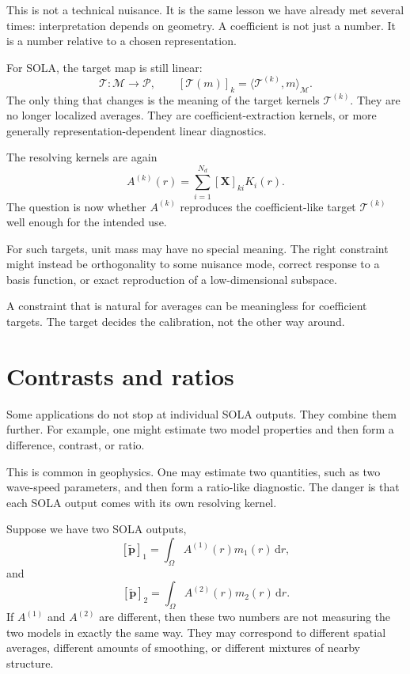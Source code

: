 \documentclass[11pt,openany]{book}
\theoremstyle{definition}
\theoremstyle{remark}
\newcommand{\M}{\mathcal M}
\newcommand{\Pspace}{\mathcal P}
\newcommand{\Tau}{\mathcal{T}}
\newcommand{\dd}{\,\mathrm d}
\begin{document}
This is not a technical nuisance. It is the same lesson we have already met several times:
interpretation depends on geometry. A coefficient is not just a number. It is a number relative
to a chosen representation.

For SOLA, the target map is still linear:
\[
  \Tau:\M\to\Pspace,
  \qquad
  [\Tau(m)]_k
  =
  \langle \mathcal T^{(k)},m\rangle_{\M}.
\]
The only thing that changes is the meaning of the target kernels \(\mathcal T^{(k)}\). They are no
longer localized averages. They are coefficient-extraction kernels, or more generally
representation-dependent linear diagnostics.

The resolving kernels are again
\[
  A^{(k)}(r)
  =
  \sum_{i=1}^{N_d}[\mathbf X]_{ki}K_i(r).
\]
The question is now whether \(A^{(k)}\) reproduces the coefficient-like target
\(\mathcal T^{(k)}\) well enough for the intended use.

For such targets, unit mass may have no special meaning. The right constraint might instead be
orthogonality to some nuisance mode, correct response to a basis function, or exact reproduction
of a low-dimensional subspace.

\begin{warningbox}
A constraint that is natural for averages can be meaningless for coefficient targets. The target
decides the calibration, not the other way around.
\end{warningbox}

\section{Contrasts and ratios}

Some applications do not stop at individual SOLA outputs. They combine them further. For
example, one might estimate two model properties and then form a difference, contrast, or ratio.

This is common in geophysics. One may estimate two quantities, such as two wave-speed
parameters, and then form a ratio-like diagnostic. The danger is that each SOLA output comes
with its own resolving kernel.

Suppose we have two SOLA outputs,
\[
  [\widetilde{\mathbf p}]_1
  =
  \int_\Omega A^{(1)}(r)m_1(r)\dd r,
\]
and
\[
  [\widetilde{\mathbf p}]_2
  =
  \int_\Omega A^{(2)}(r)m_2(r)\dd r.
\]
If \(A^{(1)}\) and \(A^{(2)}\) are different, then these two numbers are not measuring the two
models in exactly the same way. They may correspond to different spatial averages, different
amounts of smoothing, or different mixtures of nearby structure.
\end{document}
